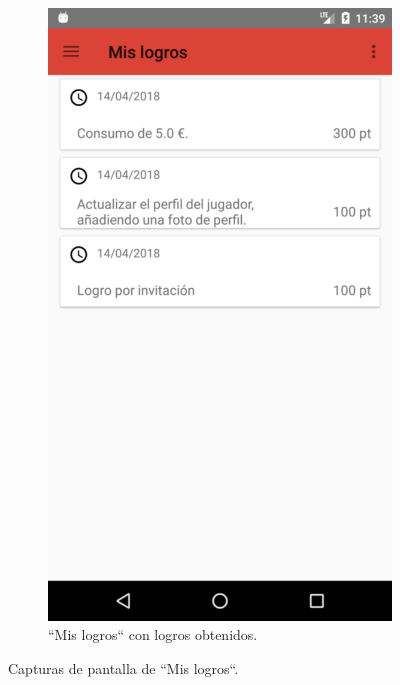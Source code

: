 \documentclass[twoside]{report}
\begin{document}
\begin{figure}[H]
\begin{center}
\begin{subfigure}[t]{.3\linewidth}
		\includegraphics[scale=0.2]{images/userguide/6.png}
		\caption{“Mis logros“ con logros obtenidos.}
	\end{subfigure}
\caption{Capturas de pantalla de “Mis logros“.}
\end{center}
\end{figure}
\end{document}
